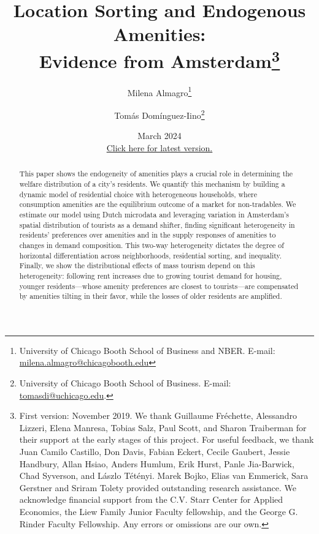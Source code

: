 \documentclass[11pt]{article}
\begin{document}
\begin{titlepage}

\onehalfspacing

\title{
Location Sorting and Endogenous Amenities:\\ Evidence from Amsterdam\thanks{\scriptsize First version: November 2019. We thank Guillaume Fr\'echette, Alessandro Lizzeri, Elena Manresa, Tobias Salz, Paul Scott, and Sharon Traiberman for their support at the early stages of this project. For useful feedback, we thank Juan Camilo Castillo, Don Davis, Fabian Eckert, Cecile Gaubert, Jessie Handbury, Allan Hsiao, Anders Humlum, Erik Hurst, Panle Jia-Barwick, Chad Syverson, and L\'aszlo T\'et\'enyi. Marek Bojko, Elias van Emmerick, Sara Gerstner and Sriram Tolety provided outstanding research assistance. We acknowledge financial support from the C.V. Starr Center for Applied Economics, the Liew Family Junior Faculty fellowship, and the George G. Rinder Faculty Fellowship. Any errors or omissions are our own.}
}


\author{Milena Almagro\thanks{\scriptsize University of Chicago Booth School of Business and NBER. E-mail: \href{mailto:milena.almagro@chicagobooth.edu}{milena.almagro@chicagobooth.edu}} \and 
Tom\'as Dom\'inguez-Iino\thanks{\scriptsize  University of Chicago Booth School of Business. E-mail: \href{mailto:tomasdi@uchicago.edu}{tomasdi@uchicago.edu}.}}

\date{
\normalsize{
March 2024 \\
\href{https://m-almagro.github.io/Location_Sorting.pdf}{Click here for latest version.}}
}

\maketitle

\begin{abstract}
This paper shows the endogeneity of amenities plays a crucial role in determining the welfare distribution of a city's residents. We quantify this mechanism by building a dynamic model of residential choice with heterogeneous households, where consumption amenities are the equilibrium outcome of a market for non-tradables. We estimate our model using Dutch microdata and leveraging variation in Amsterdam's spatial distribution of tourists as a demand shifter, finding significant heterogeneity in residents' preferences over amenities and in the supply responses of amenities to changes in demand composition. This two-way heterogeneity dictates the degree of horizontal differentiation across neighborhoods, residential sorting, and inequality. Finally, we show the distributional effects of mass tourism depend on this heterogeneity: following rent increases due to growing tourist demand for housing, younger residents---whose amenity preferences are closest to tourists---are compensated by amenities tilting in their favor, while the losses of older residents are amplified.
\end{abstract}


\setcounter{page}{0}
\thispagestyle{empty}
\end{titlepage}
\end{document}
